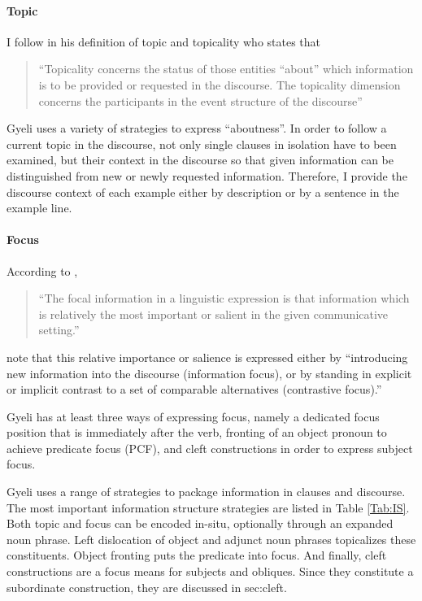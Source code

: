 \paragraph{Topic}
I follow \citet[312]{dik97} in his definition of topic and topicality who states that
\begin{quote}
``Topicality concerns the status of those entities ``about'' which information is to be provided or requested in the discourse. The topicality dimension concerns the participants in the event structure of the discourse''
\end{quote}
Gyeli uses a variety of strategies to express ``aboutness''. In order to follow a current topic in the discourse, not only single clauses in isolation have to been examined, but their context in the discourse so that given information can be distinguished from new or newly requested information. Therefore, I provide the discourse context of each example either by description or by a sentence in the example line.


\paragraph{Focus}
According to \citet[326]{dik97},
\begin{quote}
``The focal information in a linguistic expression is that information which is relatively the most important or salient in the given communicative setting.''
\end{quote}

\noindent \citet[236]{fiedler2010} note that this relative importance or salience is expressed either by
 ``introducing new information into the discourse (information focus), or by standing in explicit or implicit contrast to a set of comparable alternatives (contrastive focus).'' 

Gyeli has at least three ways of expressing focus, namely a dedicated focus position that is immediately after the verb, fronting of an object pronoun to achieve predicate focus (PCF), and cleft constructions in order to express subject focus. 



Gyeli uses a range of strategies to package information in clauses and discourse. The most important information structure strategies are listed in Table \ref{Tab:IS}. Both topic and focus can be encoded in-situ, optionally through an expanded noun phrase. Left dislocation of object and adjunct noun phrases topicalizes these constituents. Object fronting puts the predicate into focus. And finally, cleft constructions are a focus means for subjects and obliques. Since they constitute a subordinate construction, they are discussed in {sec:cleft}.



